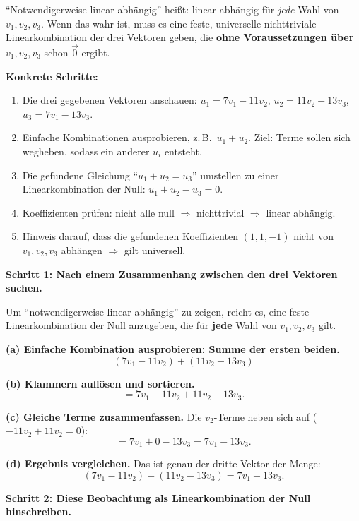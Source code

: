 \documentclass[a4paper,12pt]{article}
\begin{document}
\begin{wastun}
``Notwendigerweise linear abh\"angig'' hei\ss t: linear abh\"angig f\"ur \emph{jede} Wahl von $v_1, v_2, v_3$. Wenn das wahr ist, muss es eine feste, universelle nichttriviale Linearkombination der drei Vektoren geben, die \textbf{ohne Voraussetzungen \"uber $v_1, v_2, v_3$} schon $\vec 0$ ergibt.

\medskip
\textbf{Konkrete Schritte:}
\begin{enumerate}[leftmargin=*, nosep]
    \item Die drei gegebenen Vektoren anschauen: $u_1 = 7v_1 - 11v_2$, $u_2 = 11v_2 - 13v_3$, $u_3 = 7v_1 - 13v_3$.
    \item Einfache Kombinationen ausprobieren, z.\,B.\ $u_1 + u_2$. Ziel: Terme sollen sich wegheben, sodass ein anderer $u_i$ entsteht.
    \item Die gefundene Gleichung ``$u_1 + u_2 = u_3$'' umstellen zu einer Linearkombination der Null: $u_1 + u_2 - u_3 = 0$.
    \item Koeffizienten pr\"ufen: nicht alle null $\Rightarrow$ nichttrivial $\Rightarrow$ linear abh\"angig.
    \item Hinweis darauf, dass die gefundenen Koeffizienten $(1, 1, -1)$ nicht von $v_1, v_2, v_3$ abh\"angen $\Rightarrow$ gilt universell.
\end{enumerate}
\end{wastun}

\medskip

\textbf{Schritt 1: Nach einem Zusammenhang zwischen den drei Vektoren suchen.}

Um ``notwendigerweise linear abh\"angig'' zu zeigen, reicht es, eine feste
Linearkombination der Null anzugeben, die f\"ur \textbf{jede} Wahl von $v_1, v_2, v_3$ gilt.

\textbf{(a) Einfache Kombination ausprobieren: Summe der ersten beiden.}
\[
(7v_1 - 11v_2) + (11v_2 - 13v_3)
\]

\textbf{(b) Klammern aufl\"osen und sortieren.}
\[
= 7v_1 - 11v_2 + 11v_2 - 13v_3.
\]

\textbf{(c) Gleiche Terme zusammenfassen.} Die $v_2$-Terme heben sich auf ($-11v_2 + 11v_2 = 0$):
\[
= 7v_1 + 0 - 13v_3 = 7v_1 - 13v_3.
\]

\textbf{(d) Ergebnis vergleichen.} Das ist genau der dritte Vektor der Menge:
\[
(7v_1 - 11v_2) + (11v_2 - 13v_3) = 7v_1 - 13v_3.
\]

\medskip

\textbf{Schritt 2: Diese Beobachtung als Linearkombination der Null hinschreiben.}
\end{document}

